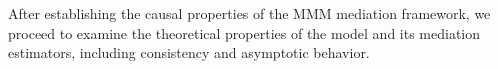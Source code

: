 \documentclass[
  12pt]{article}
\begin{document}
%
%
%
%
After establishing the causal properties of the MMM mediation framework, we proceed to examine the theoretical properties of the model and its mediation estimators, including consistency and asymptotic behavior.


\end{document}
